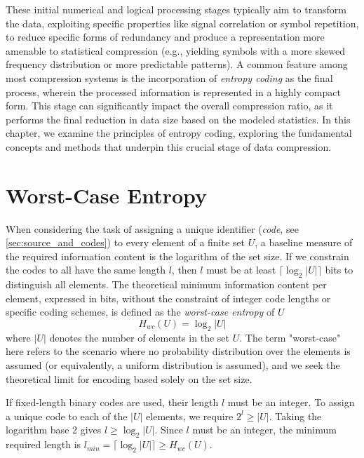 \noindent These initial numerical and logical processing stages typically aim to transform the data, exploiting specific properties like signal correlation or symbol repetition, to reduce specific forms of redundancy and produce a representation more amenable to statistical compression (e.g., yielding symbols with a more skewed frequency distribution or more predictable patterns). A common feature among most compression systems is the incorporation of \emph{entropy coding} as the final process, wherein the processed information is represented in a highly compact form. This stage can significantly impact the overall compression ratio, as it performs the final reduction in data size based on the modeled statistics. In this chapter, we examine the principles of entropy coding, exploring the fundamental concepts and methods that underpin this crucial stage of data compression.

\section{Worst-Case Entropy} \label{sec:worst_case_entropy}
When considering the task of assigning a unique identifier (\emph{code}, see \autoref{sec:source_and_codes}) to every element of a finite set $U$, a baseline measure of the required information content is the logarithm of the set size. If we constrain the codes to all have the same length $l$, then $l$ must be at least $\lceil \log_2 |U| \rceil$ bits to distinguish all elements. The theoretical minimum information content per element, expressed in bits, without the constraint of integer code lengths or specific coding schemes, is defined as the \emph{worst-case entropy} of $U$ \cite{ElementsofInformationTheory}
\begin{equation}
    H_{wc}(U) = \log_2 |U|
    \label{eq:worst_case_entropy_def}
\end{equation}
where $|U|$ denotes the number of elements in the set $U$. The term "worst-case" here refers to the scenario where no probability distribution over the elements is assumed (or equivalently, a uniform distribution is assumed), and we seek the theoretical limit for encoding based solely on the set size.

\begin{remark}
    If fixed-length binary codes are used, their length $l$ must be an integer. To assign a unique code to each of the $|U|$ elements, we require $2^l \ge |U|$. Taking the logarithm base 2 gives $l \ge \log_2 |U|$. Since $l$ must be an integer, the minimum required length is $l_{min} = \lceil \log_2 |U| \rceil \ge H_{wc}(U)$.
\end{remark}


